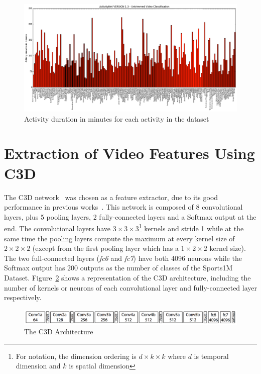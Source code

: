 \begin{figure}[ht]
\begin{center}
\includegraphics[width=1\linewidth]{img/methodology/dataset_stats}
\end{center}
\caption{Activity duration in minutes for each activity in the dataset}
\label{fig:dataset_stats}
\end{figure}

\section{Extraction of Video Features Using C3D}

The C3D network~\cite{tran2014learning} was chosen as a feature extractor, due to its good performance in previous works~\cite{baccouche2011sequential,tran2015deep,tran2014learning,shoutemporal}. This network is composed of 8 convolutional layers, plus 5 pooling layers, 2 fully-connected layers and a Softmax output at the end.
The convolutional layers have $3 \times 3 \times 3$\footnote{For notation, the dimension ordering is $d \times k \times k$ where $d$ is temporal dimension and $k$ is spatial dimension} kernels and stride 1 while at the same time the pooling layers compute the maximum at every kernel size of $2 \times 2 \times 2$ (except from the first pooling layer which has a $1 \times 2 \times 2$ kernel size).
The two full-connected layers (\textit{fc6} and \textit{fc7}) have both 4096 neurons while the Softmax output has 200 outputs as the number of classes of the Sports1M Dataset. Figure~\ref{fig:c3d_architecture} shows a representation of the C3D architecture, including the number of kernels or neurons of each convolutional layer and fully-connected layer respectively.

\begin{figure}[H]
\begin{center}
\includegraphics[width=1\linewidth]{img/methodology/c3d_architecture}
\end{center}
\caption{The C3D Architecture}
\label{fig:c3d_architecture}
\end{figure}

